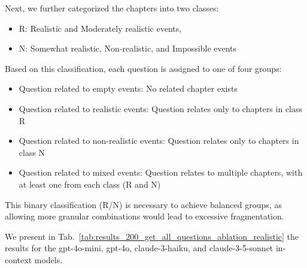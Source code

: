 \documentclass{article}
\begin{document}
Next, we further categorized the chapters into two classes:
\begin{itemize}
\item R: Realistic and Moderately realistic events,
\item N: Somewhat realistic, Non-realistic, and Impossible events
\end{itemize}

Based on this classification, each question is assigned to one of four groups:
\begin{itemize}
\item Question related to empty events: No related chapter exists
\item Question related to realistic events: Question relates only to chapters in class R
\item Question related to non-realistic events: Question relates only to chapters in class N
\item Question related to mixed events: Question relates to multiple chapters, with at least one from each class (R and N)
\end{itemize}

This binary classification (R/N) is necessary to achieve balanced groups, as allowing more granular combinations would lead to excessive fragmentation.

We present in Tab.~\ref{tab:results_200_get_all_questions_ablation_realistic} the results for the gpt-4o-mini, gpt-4o, claude-3-haiku, and claude-3-5-sonnet in-context models.

\begin{table}[]

\end{table}
\end{document}
